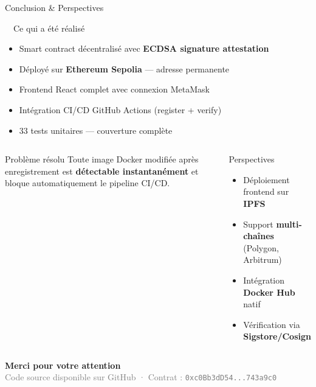 \documentclass[aspectratio=169]{beamer}
\begin{document}
\begin{frame}{Conclusion \& Perspectives}

  \begin{block}{\faTrophy\ \ Ce qui a été réalisé}
    \begin{itemize}
      \item Smart contract décentralisé avec \textbf{ECDSA signature attestation}
      \item Déployé sur \textbf{Ethereum Sepolia} — adresse permanente
      \item Frontend React complet avec connexion MetaMask
      \item Intégration CI/CD GitHub Actions (register + verify)
      \item 33 tests unitaires — couverture complète
    \end{itemize}
  \end{block}

  \vspace{0.3cm}

  \begin{columns}[T]
      \begin{exampleblock}{Problème résolu}
        Toute image Docker modifiée après enregistrement
        est \textbf{détectable instantanément} et bloque
        automatiquement le pipeline CI/CD.
      \end{exampleblock}

      \begin{block}{Perspectives}
        \begin{itemize}
          \item Déploiement frontend sur \textbf{IPFS}
          \item Support \textbf{multi-chaînes} (Polygon, Arbitrum)
          \item Intégration \textbf{Docker Hub} natif
          \item Vérification via \textbf{Sigstore/Cosign}
        \end{itemize}
      \end{block}
  \end{columns}

  \vspace{0.3cm}
  \begin{center}
    \textcolor{dockerblue}{\large\textbf{Merci pour votre attention}}\\
    \vspace{0.2cm}
    \small\textcolor{gray}{Code source disponible sur GitHub · Contrat :
    \texttt{0xc0Bb3dD54...743a9c0}}
  \end{center}

\end{frame}

\end{document}
